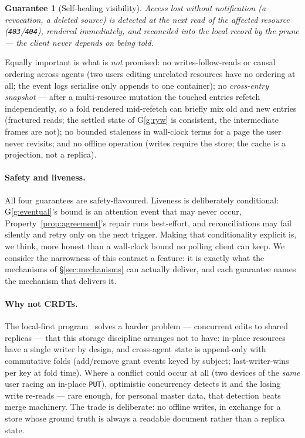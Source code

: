 \documentclass[11pt,a4paper]{article}
\newtheorem{guarantee}{Guarantee}[section]
\theoremstyle{remark}
\newcommand{\code}[1]{\texttt{#1}}
\begin{document}
\begin{guarantee}[Self-healing visibility]\label{g:heal}
Access lost without notification (a revocation, a deleted source) is detected at
the next read of the affected resource (\code{403}/\code{404}), rendered
immediately, and reconciled into the local record by the prune --- the client
never depends on being told.
\end{guarantee}

Equally important is what is \emph{not} promised: no writes-follow-reads or
causal ordering across agents (two users editing unrelated resources have no
ordering at all; the event logs serialise only appends to one container); no
\emph{cross-entry snapshot} --- after a multi-resource mutation the touched
entries refetch independently, so a fold rendered mid-refetch can briefly mix
old and new entries (fractured reads; the settled state of G\ref{g:ryw} is
consistent, the intermediate frames are not); no bounded staleness in
wall-clock terms for a page the user never revisits; and no offline operation
(writes require the store; the cache is a projection, not a replica).

\paragraph{Safety and liveness.}\label{sec:liveness}
All four guarantees are safety-flavoured. Liveness is deliberately
conditional: G\ref{g:eventual}'s bound is an attention event that may never
occur, Property~\ref{prop:agreement}'s repair runs best-effort, and
reconciliations may fail silently and retry only on the next trigger. Making
that conditionality explicit is, we think, more honest than a wall-clock bound
no polling client can keep. We consider the narrowness of this contract a
feature: it is exactly what the mechanisms of \S\ref{sec:mechanisms} can
actually deliver, and each guarantee names the mechanism that delivers it.

\paragraph{Why not CRDTs.} The local-first program~\cite{kleppmann2019,
shapiro2011} solves a harder problem --- concurrent edits to shared replicas ---
that this storage discipline arranges not to have: in-place resources have a
single writer by design, and cross-agent state is append-only with commutative
folds (add/remove grant events keyed by subject; last-writer-wins per key at
fold time). Where a conflict could occur at all (two devices of the \emph{same}
user racing an in-place \code{PUT}), optimistic concurrency detects it and the
losing write re-reads --- rare enough, for personal master data, that detection
beats merge machinery. The trade is deliberate: no offline writes, in exchange
for a store whose ground truth is always a readable document rather than a
replica state.
\end{document}
